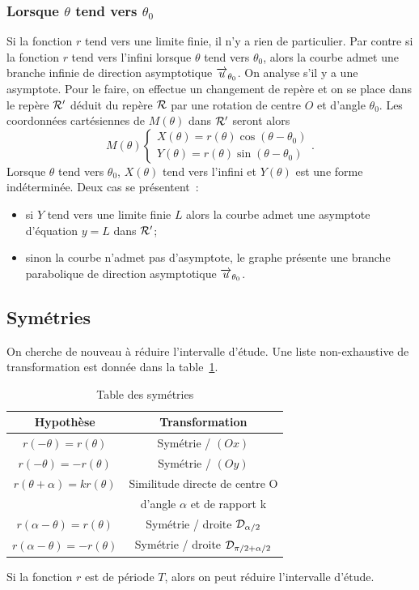 \subsubsection{Lorsque \(\theta\) tend vers \(\theta_0\)}
Si la fonction \(r\) tend vers une limite finie, il n'y a rien de particulier. Par contre si la fonction \(r\) tend vers l'infini lorsque \(\theta\) tend vers \(\theta_0\), alors la courbe admet une branche infinie de direction asymptotique \(\overrightarrow{u}_{\theta_0}\). On analyse s'il y a une asymptote. Pour le faire, on effectue un changement de repère et on se place dans le repère \(\mathcal{R}'\) déduit du repère \(\mathcal{R}\) par une rotation de centre \(O\) et d'angle \(\theta_0\). Les coordonnées cartésiennes de \(M(\theta)\) dans \(\mathcal{R}'\) seront alors
\begin{equation}
  M(\theta)
  \begin{cases}
    X(\theta)=r(\theta)\cos(\theta-\theta_0)\\
    Y(\theta)=r(\theta)\sin(\theta-\theta_0)
  \end{cases}.
\end{equation}
Lorsque \(\theta\) tend vers \(\theta_0\), \(X(\theta)\) tend vers l'infini et \(Y(\theta)\) est une forme indéterminée. Deux cas se présentent~:
\begin{itemize}
\item si \(Y\) tend vers une limite finie \(L\) alors la courbe admet une asymptote d'équation \(y=L\) dans \(\mathcal{R}'\);
\item sinon la courbe n'admet pas d'asymptote, le graphe présente une branche parabolique de direction asymptotique \(\overrightarrow{u}_{\theta_0}\).
\end{itemize}

\subsection{Symétries}
On cherche de nouveau à réduire l'intervalle d'étude. Une liste non-exhaustive de transformation est donnée dans la table~\ref{tab:sympol}.
\begin{table}
  \centering
  \begin{tabular}{|c|c|}\hline
    Hypothèse & Transformation \\ \hline
    \(r(-\theta)=r(\theta)\) & Symétrie / \((Ox)\) \\ \hline
    \(r(-\theta)=-r(\theta)\) & Symétrie / \((Oy)\) \\ \hline
    \(r(\theta+\alpha)=kr(\theta)\) & Similitude directe de centre O \\ & d'angle \(\alpha\) et de rapport k \\ \hline
    \(r(\alpha-\theta)=r(\theta)\) & Symétrie / droite \(\mathcal{D}_{\alpha/2}\) \\ \hline
    \(r(\alpha-\theta)=-r(\theta)\) & Symétrie / droite \(\mathcal{D}_{\pi/2 + \alpha/2}\) \\ \hline
 \end{tabular}
 \caption{Table des symétries}
 \label{tab:sympol}
\end{table}
Si la fonction \(r\) est de période \(T\), alors on peut réduire l'intervalle d'étude.
